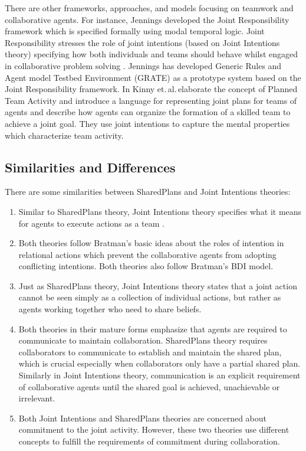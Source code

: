 \documentclass[12pt]{report}
\begin{document}
There are other frameworks, approaches, and models focusing on teamwork and
collaborative agents. For instance, Jennings developed the Joint Responsibility
framework which is specified formally using modal temporal logic. Joint
Responsibility stresses the role of joint intentions (based on Joint Intentions
theory) specifying how both individuals and teams should behave whilst engaged
in collaborative problem solving \cite{jennings:joint-responsibility,
jennings:on-responsible, jennings:joint-intention-hybrid,
jennings:joint-responsibility-dynamic}. Jennings has developed Generic Rules and
Agent model Testbed Environment (GRATE) as a prototype system based on the Joint
Responsibility framework. In \cite{kinny:planned-team} Kinny et.\,al.\,elaborate
the concept of Planned Team Activity and introduce a language for representing joint plans for teams of agents and describe how agents can
organize the formation of a skilled team to achieve a joint goal. They use joint
intentions to capture the mental properties which characterize team activity.

\subsection{Similarities and Differences}
\label{sec:collaboration-theories-comparison}
There are some similarities between SharedPlans and Joint Intentions theories:

\begin{enumerate}
  \item Similar to SharedPlans theory, Joint Intentions theory specifies what it
  means for agents to execute actions as a team
  \cite{subramanian:joint-intention-dialogue}.
  
  \item Both theories follow Bratman's basic ideas about the roles of intention
  in relational actions which prevent the collaborative agents from adopting
  conflicting intentions. Both theories also follow Bratman's BDI model.
  
  \item Just as SharedPlans theory, Joint Intentions theory states that a
  joint action cannot be seen simply as a collection of individual actions, but
  rather as agents working together who need to share beliefs.
  
  \item Both theories in their mature forms emphasize that agents are required
  to communicate to maintain collaboration. SharedPlans theory requires
  collaborators to communicate to establish and maintain the shared plan, which
  is crucial especially when collaborators only have a partial shared plan.
  Similarly in Joint Intentions theory, communication is an explicit requirement
  of collaborative agents until the shared goal is achieved, unachievable or
  irrelevant.
  
  \item Both Joint Intentions and SharedPlans theories are concerned about
  commitment to the joint activity. However, these two theories use different
  concepts to fulfill the requirements of commitment during collaboration.
\end{enumerate}
\end{document}
